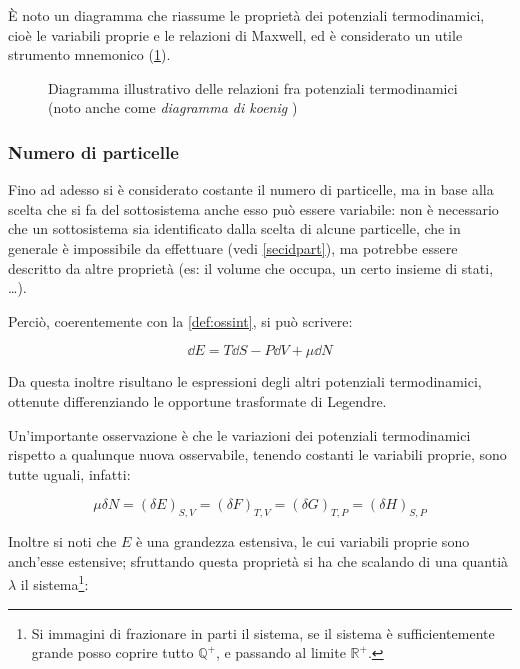 \`E noto un diagramma che riassume le proprietà dei potenziali termodinamici, cioè le variabili proprie e le relazioni di Maxwell, ed è considerato un utile strumento mnemonico (\cref{fig:maxrel}).

\begin{figure}[t]
	\centering
	
	\caption{Diagramma illustrativo delle relazioni fra potenziali termodinamici (noto anche come \textit{diagramma di koenig} )}
	\label{fig:maxrel}
\end{figure}

\subsubsection{Numero di particelle}
Fino ad adesso si è considerato costante il numero di particelle, ma in base alla scelta che si fa del sottosistema anche esso può essere variabile: non è necessario che un sottosistema sia identificato dalla scelta di alcune particelle, che in generale è impossibile da effettuare (vedi \cref{secidpart}), ma potrebbe essere descritto da altre proprietà (es: il volume che occupa, un certo insieme di stati, \dots).

Perciò, coerentemente con la \cref{def:ossint}, si può scrivere:

\begin{equation*}
\dd E = T \dd S - P \dd V + \mu \dd N
\end{equation*}

\noindent Da questa inoltre risultano le espressioni degli altri potenziali termodinamici, ottenute differenziando le opportune trasformate di Legendre.

\begin{note}
	Un'importante osservazione è che le variazioni dei potenziali termodinamici rispetto a qualunque nuova osservabile, tenendo costanti le variabili proprie, sono tutte uguali, infatti:
	
	\begin{equation*}
	\mu \delta N = (\delta E)_{S, V} = (\delta F)_{T,V} = (\delta G)_{T,P} = (\delta H)_{S,P}
	\end{equation*}
\end{note}

Inoltre si noti che $E$ è una grandezza estensiva, le cui variabili proprie sono anch'esse estensive; sfruttando questa proprietà si ha che scalando di una quantià $\lambda$ il sistema\footnote{Si immagini di frazionare in parti il sistema, se il sistema è sufficientemente grande posso coprire tutto $\mathbb{Q}^+$, e passando al limite $\mathbb{R}^+$.}:

